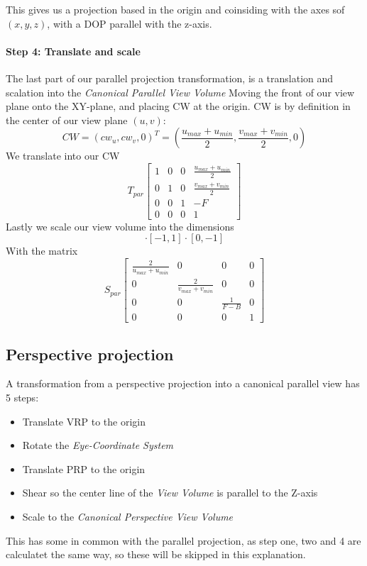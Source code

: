 \documentclass{article}
\begin{document}
This gives us a projection based in the origin and coinsiding
with the axes sof $(x,y,z)$, with a DOP parallel with the z-axis.

\paragraph{Step 4: Translate and scale}
The last part of our parallel projection transformation, is a
translation and scalation into the \emph{Canonical Parallel View Volume}
Moving the front of our view plane onto the XY-plane, and placing CW at the origin.
CW is by definition in the center of our view plane $(u,v)$:
\begin{equation*}
    CW = (cw_u,cw_v,0)^T = (\frac{u_{max} + u_{min}}{2},\frac{v_{max} + v_{min}}{2},0)
\end{equation*}
We translate into our CW
\begin{equation*} 
    T_{par}
    \begin{bmatrix}
        1 & 0 & 0 & \frac{u_{max} + u_{min}}{2}\\ 
        0 & 1 & 0 & \frac{v_{max} + v_{min}}{2}\\
        0 & 0 & 1 & -F\\
        0 & 0 & 0 & 1
    \end{bmatrix}
\end{equation*}
Lastly we scale our view volume into the dimensions
\begin{equation*}
    [-1,1]\cdot[-1,1]\cdot[0,-1]
\end{equation*}
With the matrix
\begin{equation*}
    S_{par}
    \begin{bmatrix}
        \frac{2}{u_{max} + u_{min}} & 0 & 0 & 0\\ 
        0 & \frac{2}{v_{max} + v_{min}} & 0 & 0\\
        0 & 0 & \frac{1}{F - B} & 0\\
        0 & 0 & 0 & 1
    \end{bmatrix}
\end{equation*}


\subsection{Perspective projection}
A transformation from a perspective projection into a canonical
parallel view has 5 steps:
\begin{itemize}
    \item{Translate VRP to the origin}
    \item{Rotate the \emph{Eye-Coordinate System}}
    \item{Translate PRP to the origin}
    \item{Shear so the center line of the \emph{View Volume} is parallel to the Z-axis}
    \item{Scale to the \emph{Canonical Perspective View Volume}}
\end{itemize}
This has some in common with the parallel projection, as step one,
two and 4 are calculatet the same way, so these will be skipped in this
explanation.
\end{document}
